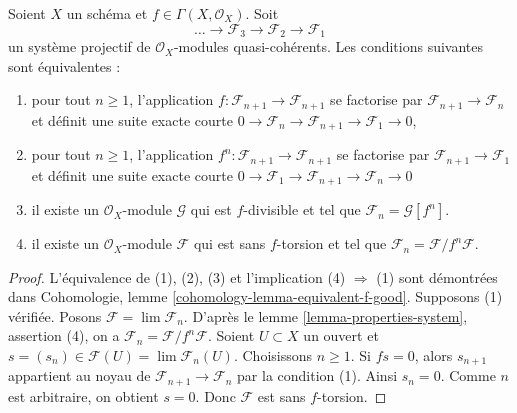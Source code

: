 \begin{lemma}
\label{lemma-equivalent-f-good}
Soient $X$ un schéma et $f \in \Gamma(X, \mathcal{O}_X)$. Soit
$$
\ldots \to \mathcal{F}_3 \to \mathcal{F}_2 \to \mathcal{F}_1
$$
un système projectif de $\mathcal{O}_X$-modules quasi-cohérents.
Les conditions suivantes sont équivalentes :
\begin{enumerate}
\item pour tout $n \geq 1$, l'application
$f : \mathcal{F}_{n + 1} \to \mathcal{F}_{n + 1}$ se factorise
par $\mathcal{F}_{n + 1} \to \mathcal{F}_n$ et définit une
suite exacte courte
$0 \to \mathcal{F}_n \to \mathcal{F}_{n + 1} \to \mathcal{F}_1 \to 0$,
\item pour tout $n \geq 1$, l'application
$f^n : \mathcal{F}_{n + 1} \to \mathcal{F}_{n + 1}$
se factorise par $\mathcal{F}_{n + 1} \to \mathcal{F}_1$
et définit une suite exacte courte
$0 \to \mathcal{F}_1 \to \mathcal{F}_{n + 1} \to \mathcal{F}_n \to 0$
\item il existe un $\mathcal{O}_X$-module $\mathcal{G}$
qui est $f$-divisible et tel que $\mathcal{F}_n = \mathcal{G}[f^n]$.
\item il existe un $\mathcal{O}_X$-module $\mathcal{F}$ qui est
sans $f$-torsion et tel que $\mathcal{F}_n = \mathcal{F}/f^n\mathcal{F}$.
\end{enumerate}
\end{lemma}

\begin{proof}
L'équivalence de (1), (2), (3) et l'implication (4) $\Rightarrow$ (1)
sont démontrées dans Cohomologie, lemme \ref{cohomology-lemma-equivalent-f-good}.
Supposons (1) vérifiée. Posons
$\mathcal{F} = \lim \mathcal{F}_n$. D'après le lemme \ref{lemma-properties-system},
assertion (4), on a $\mathcal{F}_n = \mathcal{F}/f^n\mathcal{F}$.
Soient $U \subset X$ un ouvert et
$s = (s_n) \in \mathcal{F}(U) = \lim \mathcal{F}_n(U)$.
Choisissons $n \geq 1$. Si $fs = 0$, alors $s_{n + 1}$ appartient au noyau de
$\mathcal{F}_{n + 1} \to \mathcal{F}_n$ par la condition (1).
Ainsi $s_n = 0$. Comme $n$ est arbitraire, on obtient $s = 0$.
Donc $\mathcal{F}$ est sans $f$-torsion.
\end{proof}


